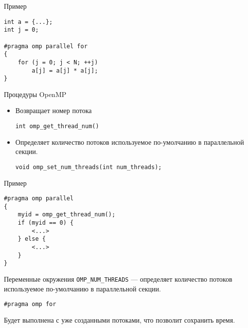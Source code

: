 \begin{frame}[fragile]{Пример}

\begin{lstlisting}
int a = {...};
int j = 0;

#pragma omp parallel for
{
    for (j = 0; j < N; ++j)
        a[j] = a[j] * a[j];
}
\end{lstlisting}

\end{frame}

\begin{frame}[fragile]{Процедуры OpenMP}

\begin{itemize}
    \item Возвращает номер потока
    \begin{lstlisting}
int omp_get_thread_num()
    \end{lstlisting}

    \item Определяет количество потоков используемое по-умолчанию в параллельной секции.
    \begin{lstlisting}
void omp_set_num_threads(int num_threads);
    \end{lstlisting}
\end{itemize}

\end{frame}

\begin{frame}[fragile]{Пример}

\begin{lstlisting}
#pragma omp parallel
{
    myid = omp_get_thread_num();
    if (myid == 0) {
        <...>
    } else {
        <...>
    }
}
\end{lstlisting}

\end{frame}

\begin{frame}{Переменные окружения}
\texttt{OMP_NUM_THREADS} --- определяет количество потоков используемое по-умолчанию в параллельной секции.
\end{frame}

\begin{frame}[fragile]

\begin{lstlisting}
#pragma omp for
\end{lstlisting}

Будет выполнена с уже созданными потоками, что позволит сохранить время.

\end{frame}

